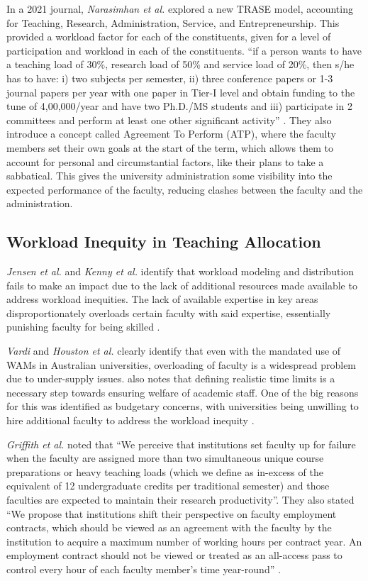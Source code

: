 In a 2021 journal, \textit{Narasimhan et al.} explored a new TRASE model, accounting for Teaching, Research, Administration, Service, and Entrepreneurship. This provided a workload factor for each of the constituents, given for a level of participation and workload in each of the constituents. ``if a person wants to have a teaching load of 30\%, research load of 50\% and service load of 20\%, then s/he has to have: i) two subjects per semester, ii) three conference papers or 1-3 journal papers per year with one paper in Tier-I level and obtain funding to the tune of 4,00,000/year and have two Ph.D./MS students and iii) participate in 2 committees and perform at least one other significant activity'' \cite{narasimhan32trase}. They also introduce a concept called Agreement To Perform (ATP), where the faculty members set their own goals at the start of the term, which allows them to account for personal and circumstantial factors, like their plans to take a sabbatical. This gives the university administration some visibility into the expected performance of the faculty, reducing clashes between the faculty and the administration.

\subsection{Workload Inequity in Teaching Allocation}

\textit{Jensen et al.} \cite{jensen2009overload} and \textit{Kenny et al.} identify that workload modeling and distribution fails to make an impact due to the lack of additional resources made available to address workload inequities. The lack of available expertise in key areas disproportionately overloads certain faculty with said expertise, essentially punishing faculty for being skilled \cite{jensen2009overload, kenny2014effectiveness}.

\textit{Vardi} and \textit{Houston et al.} \cite{vardi2009impacts, houston2006academic} clearly identify that even with the mandated use of WAMs in Australian universities, overloading of faculty is a widespread problem due to under-supply issues.\cite{kenny2014effectiveness} also notes that defining realistic time limits is a necessary step towards ensuring welfare of academic staff. One of the big reasons for this was identified as budgetary concerns, with universities being unwilling to hire additional faculty to address the workload inequity \cite{kenny2012placing}.

\textit{Griffith et al.} noted that ``We perceive that institutions set faculty up for failure when the faculty are assigned more than two simultaneous unique course preparations or heavy teaching loads (which we define as in-excess of the equivalent of 12 undergraduate credits per traditional semester) and those faculties are expected to maintain their research productivity''. They also stated ``We propose that institutions shift their perspective on faculty employment contracts, which should be viewed as an agreement with the faculty by the institution to acquire a maximum number of working hours per contract year. An employment contract should not be viewed or treated as an all-access pass to control every hour of each faculty member's time year-round'' \cite{griffith2020framework}.

